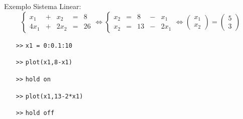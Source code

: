 \documentclass[hyperref={pdfpagelabels=false}]{beamer}
\begin{document}
\begin{frame}{Exemplo}
  Sistema Linear: 
  \begin{equation*}
    \left\{ 
    \begin{matrix} 
      x_1&+&x_2&=&8\\
      4x_1&+&2x_2&=&26 
    \end{matrix} 
    \right. \Leftrightarrow \left\{ 
    \begin{matrix} 
      x_2&=&8 &-& x_1\\
      x_2&=&13 &-& 2x_1
    \end{matrix} 
    \right.\Leftrightarrow 
    \begin{pmatrix}
      x_1\\x_2
    \end{pmatrix} = 
    \begin{pmatrix}
      5\\3
    \end{pmatrix}
  \end{equation*}
  \vfill
  \begin{itemize}
  \item[{\texttt{>>}}] {\texttt{x1 = 0:0.1:10}}
  \item[{\texttt{>>}}] {\texttt{plot(x1,8-x1)}}
  \item[{\texttt{>>}}] {\texttt{\alert{hold on}}}
  \item[{\texttt{>>}}] {\texttt{plot(x1,13-2*x1)}}
  \item[{\texttt{>>}}] {\texttt{\alert{hold off}}}
  \end{itemize}
\end{frame}
\end{document}
